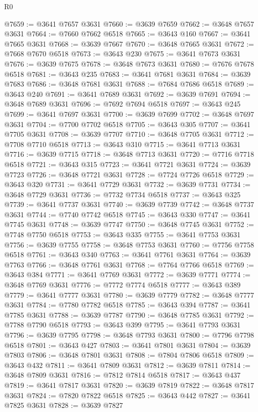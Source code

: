 \begin{lexlean}{R0}
\begin{coremodule}
@7659 := @3641 @7657 @3631
@7660 := @3639 @7659
@7662 := @3648 @7657 @3631
@7664 := @7660 @7662 @6518
@7665 := @3643 @160
@7667 := @3641 @7665 @3631
@7668 := @3639 @7667
@7670 := @3648 @7665 @3631
@7672 := @7668 @7670 @6518
@7673 := @3643 @230
@7675 := @3641 @7673 @3631
@7676 := @3639 @7675
@7678 := @3648 @7673 @3631
@7680 := @7676 @7678 @6518
@7681 := @3643 @235
@7683 := @3641 @7681 @3631
@7684 := @3639 @7683
@7686 := @3648 @7681 @3631
@7688 := @7684 @7686 @6518
@7689 := @3643 @240
@7691 := @3641 @7689 @3631
@7692 := @3639 @7691
@7694 := @3648 @7689 @3631
@7696 := @7692 @7694 @6518
@7697 := @3643 @245
@7699 := @3641 @7697 @3631
@7700 := @3639 @7699
@7702 := @3648 @7697 @3631
@7704 := @7700 @7702 @6518
@7705 := @3643 @305
@7707 := @3641 @7705 @3631
@7708 := @3639 @7707
@7710 := @3648 @7705 @3631
@7712 := @7708 @7710 @6518
@7713 := @3643 @310
@7715 := @3641 @7713 @3631
@7716 := @3639 @7715
@7718 := @3648 @7713 @3631
@7720 := @7716 @7718 @6518
@7721 := @3643 @315
@7723 := @3641 @7721 @3631
@7724 := @3639 @7723
@7726 := @3648 @7721 @3631
@7728 := @7724 @7726 @6518
@7729 := @3643 @320
@7731 := @3641 @7729 @3631
@7732 := @3639 @7731
@7734 := @3648 @7729 @3631
@7736 := @7732 @7734 @6518
@7737 := @3643 @325
@7739 := @3641 @7737 @3631
@7740 := @3639 @7739
@7742 := @3648 @7737 @3631
@7744 := @7740 @7742 @6518
@7745 := @3643 @330
@7747 := @3641 @7745 @3631
@7748 := @3639 @7747
@7750 := @3648 @7745 @3631
@7752 := @7748 @7750 @6518
@7753 := @3643 @335
@7755 := @3641 @7753 @3631
@7756 := @3639 @7755
@7758 := @3648 @7753 @3631
@7760 := @7756 @7758 @6518
@7761 := @3643 @340
@7763 := @3641 @7761 @3631
@7764 := @3639 @7763
@7766 := @3648 @7761 @3631
@7768 := @7764 @7766 @6518
@7769 := @3643 @384
@7771 := @3641 @7769 @3631
@7772 := @3639 @7771
@7774 := @3648 @7769 @3631
@7776 := @7772 @7774 @6518
@7777 := @3643 @389
@7779 := @3641 @7777 @3631
@7780 := @3639 @7779
@7782 := @3648 @7777 @3631
@7784 := @7780 @7782 @6518
@7785 := @3643 @394
@7787 := @3641 @7785 @3631
@7788 := @3639 @7787
@7790 := @3648 @7785 @3631
@7792 := @7788 @7790 @6518
@7793 := @3643 @399
@7795 := @3641 @7793 @3631
@7796 := @3639 @7795
@7798 := @3648 @7793 @3631
@7800 := @7796 @7798 @6518
@7801 := @3643 @427
@7803 := @3641 @7801 @3631
@7804 := @3639 @7803
@7806 := @3648 @7801 @3631
@7808 := @7804 @7806 @6518
@7809 := @3643 @432
@7811 := @3641 @7809 @3631
@7812 := @3639 @7811
@7814 := @3648 @7809 @3631
@7816 := @7812 @7814 @6518
@7817 := @3643 @437
@7819 := @3641 @7817 @3631
@7820 := @3639 @7819
@7822 := @3648 @7817 @3631
@7824 := @7820 @7822 @6518
@7825 := @3643 @442
@7827 := @3641 @7825 @3631
@7828 := @3639 @7827

\end{coremodule}
\end{lexlean}
